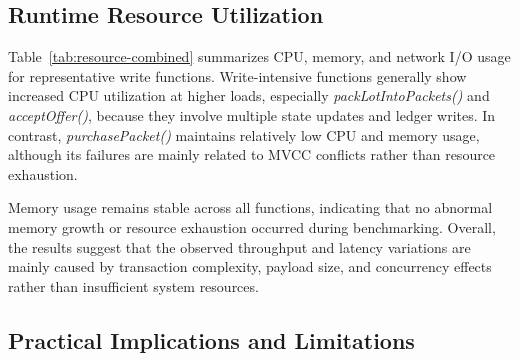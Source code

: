 \documentclass[12pt]{article}
\begin{document}
\subsection{Runtime Resource Utilization}

Table~\ref{tab:resource-combined} summarizes CPU, memory, and network I/O usage for representative write functions. Write-intensive functions generally show increased CPU utilization at higher loads, especially \textit{packLotIntoPackets()} and \textit{acceptOffer()}, because they involve multiple state updates and ledger writes. In contrast, \textit{purchasePacket()} maintains relatively low CPU and memory usage, although its failures are mainly related to MVCC conflicts rather than resource exhaustion.

Memory usage remains stable across all functions, indicating that no abnormal memory growth or resource exhaustion occurred during benchmarking. Overall, the results suggest that the observed throughput and latency variations are mainly caused by transaction complexity, payload size, and concurrency effects rather than insufficient system resources.

\begin{table}[h]
	\centering
	\caption{Runtime Resource Utilization of Smart Contract Functions at 500 TPS Load}
	\label{tab:resource-combined}
\end{table}
	

	\subsection{Practical Implications and Limitations}
	
\end{document}
